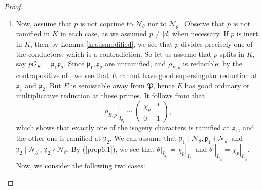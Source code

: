 \documentclass[]{article}
\newcommand {\mfp}{{\mathfrak{P}}}
\newcounter{cases}
\begin{document}
\begin{proof}
\begin{enumerate}
    
    \item Now, assume that $p$ is not coprime to $\mathcal{N}_\theta$ nor to $\mathcal{N}_{\theta^{\prime}}$. Observe that $p$ is not ramified in $K$ in each case, as we assumed $p\ne |d|$ when necessary. If $p$ is inert in $K$, then by Lemma \ref{krausmodified}, we see that $p$ divides precisely one of the conductors, which is a contradiction. So let us assume that $p$ splits in $K$, say $p\mathcal{O}_K=\mathfrak{p}_1 \mathfrak{p}_2$. Since $\mathfrak{p}_1, \mathfrak{p}_2$ are unramified, and $\bar{\rho}_{E, p}$ is reducible; by the contrapositive of \cite[Corollary 6.2]{freitas2015fermat}, we see that $E$ cannot have good supersingular reduction at $\mathfrak{p}_1$ and $\mathfrak{p}_2$. But $E$ is semistable away from $\mfp$, hence $E$ has good ordinary or multiplicative reduction at these primes. It follows from \cite[Proposition 6.1(ii)]{freitas2015fermat} that
\begin{equation}\label{prop6.1}
    \left.\bar{\rho}_{E, p}\right|_{I_{\mathfrak{p_1}}} \sim\left(\begin{array}{ll}
\chi_p & * \\
0 & 1
\end{array}\right)\text{,}
\end{equation}which shows that exactly one of the isogeny characters is ramified at $\mathfrak{p}_1$, and the other one is ramified at $\mathfrak{p}_2$. We can assume that $\mathfrak{p}_1 \mid \mathcal{N}_\theta, \mathfrak{p}_1 \nmid \mathcal{N}_{\theta^{\prime}}$ and $\mathfrak{p}_2 \mid \mathcal{N}_{\theta^{\prime}}$, $\mathfrak{p}_2 \nmid \mathcal{N}_\theta$. By (\ref{prop6.1}), we see that $\left.\theta\right|_{I_{\mathfrak{p}_1}}=\left.\chi_p\right|_{I_{\mathfrak{p}_1}}$ and $\left.\theta^{\prime}\right|_{I_{\mathfrak{p}_2}}=\left.\chi_p\right|_{I_{\mathfrak{p}_2}}$. Now, we consider the following two cases:


\end{enumerate}
\end{proof}
\end{document}
